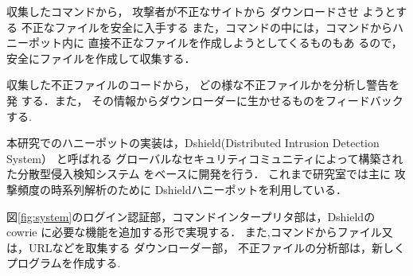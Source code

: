 \documentclass{entry}
\begin{document}
収集したコマンドから，
攻撃者が不正なサイトから
ダウンロードさせ
ようとする
不正なファイルを安全に入手する
また，コマンドの中には，コマンドからハニーポット内に
直接不正なファイルを作成しようとしてくるものもあ
るので，安全にファイルを作成して収集する．

収集した不正ファイルのコードから，
どの様な不正ファイルかを分析し警告を発
する．また，
その情報からダウンローダーに生かせるものをフィードバック
する.






本研究でのハニーポットの実装は，Dshield(Distributed Intrusion Detection System）
と呼ばれる
グローバルなセキュリティコミュニティによって構築された分散型侵入検知システム
をベースに開発を行う．
これまで研究室では主に
攻撃頻度の時系列解析のために
Dshieldハニーポットを利用している\cite{nishida2022}．

図\ref{fig:system}のログイン認証部，コマンドインタープリタ部は，Dshieldの
cowrie に必要な機能を追加する形で実現する．
また,コマンドからファイル又は，URLなどを取集する
ダウンローダー部，
不正ファイルの分析部は，新しく
プログラムを作成する.
\end{document}
